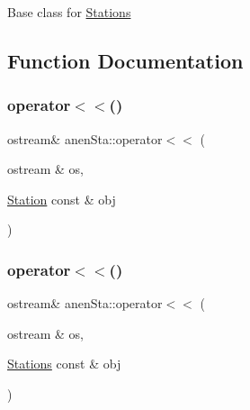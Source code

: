 Base class for \mbox{\hyperlink{classanen_sta_1_1_stations}{Stations}} 

\subsection{Function Documentation}
\mbox{\label{namespaceanen_sta_abbe68650f0c5b4173991ed2220b3143f}} 
\subsubsection{\texorpdfstring{operator$<$$<$()}{operator<<()}\hspace{0.1cm}{\footnotesize\ttfamily [1/2]}}
{\footnotesize\ttfamily ostream\& anen\+Sta\+::operator$<$$<$ (\begin{DoxyParamCaption}\item[{ostream \&}]{os,  }\item[{\mbox{\hyperlink{classanen_sta_1_1_station}{Station}} const \&}]{obj }\end{DoxyParamCaption})}

\mbox{\label{namespaceanen_sta_a08ae85128c31bfbd2999f821d7605eeb}} 
\subsubsection{\texorpdfstring{operator$<$$<$()}{operator<<()}\hspace{0.1cm}{\footnotesize\ttfamily [2/2]}}
{\footnotesize\ttfamily ostream\& anen\+Sta\+::operator$<$$<$ (\begin{DoxyParamCaption}\item[{ostream \&}]{os,  }\item[{\mbox{\hyperlink{classanen_sta_1_1_stations}{Stations}} const \&}]{obj }\end{DoxyParamCaption})}

